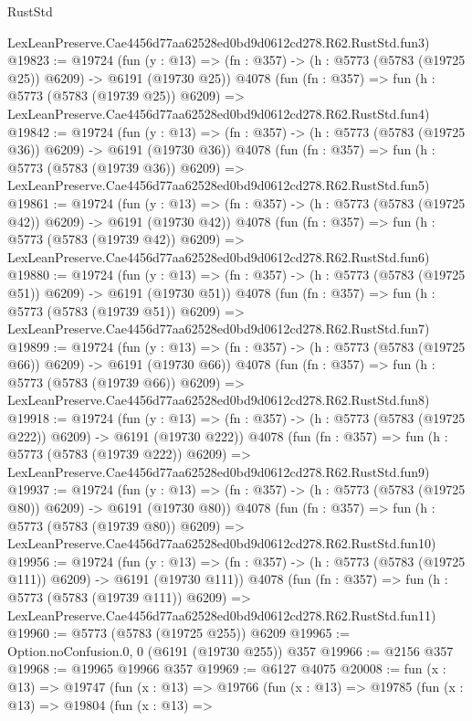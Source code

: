 \begin{lexlean}{RustStd}
\begin{coremodule}
    LexLeanPreserve.Cae4456d77aa62528ed0bd9d0612cd278.R62.RustStd.fun3)
@19823 := @19724
    (fun (y : @13) => (fn : @357) -> (h : @5773 (@5783 (@19725 @25)) @6209) -> @6191 (@19730 @25))
    @4078
    (fun (fn : @357) =>
    fun (h : @5773 (@5783 (@19739 @25)) @6209) =>
    LexLeanPreserve.Cae4456d77aa62528ed0bd9d0612cd278.R62.RustStd.fun4)
@19842 := @19724
    (fun (y : @13) => (fn : @357) -> (h : @5773 (@5783 (@19725 @36)) @6209) -> @6191 (@19730 @36))
    @4078
    (fun (fn : @357) =>
    fun (h : @5773 (@5783 (@19739 @36)) @6209) =>
    LexLeanPreserve.Cae4456d77aa62528ed0bd9d0612cd278.R62.RustStd.fun5)
@19861 := @19724
    (fun (y : @13) => (fn : @357) -> (h : @5773 (@5783 (@19725 @42)) @6209) -> @6191 (@19730 @42))
    @4078
    (fun (fn : @357) =>
    fun (h : @5773 (@5783 (@19739 @42)) @6209) =>
    LexLeanPreserve.Cae4456d77aa62528ed0bd9d0612cd278.R62.RustStd.fun6)
@19880 := @19724
    (fun (y : @13) => (fn : @357) -> (h : @5773 (@5783 (@19725 @51)) @6209) -> @6191 (@19730 @51))
    @4078
    (fun (fn : @357) =>
    fun (h : @5773 (@5783 (@19739 @51)) @6209) =>
    LexLeanPreserve.Cae4456d77aa62528ed0bd9d0612cd278.R62.RustStd.fun7)
@19899 := @19724
    (fun (y : @13) => (fn : @357) -> (h : @5773 (@5783 (@19725 @66)) @6209) -> @6191 (@19730 @66))
    @4078
    (fun (fn : @357) =>
    fun (h : @5773 (@5783 (@19739 @66)) @6209) =>
    LexLeanPreserve.Cae4456d77aa62528ed0bd9d0612cd278.R62.RustStd.fun8)
@19918 := @19724
    (fun (y : @13) => (fn : @357) -> (h : @5773 (@5783 (@19725 @222)) @6209) -> @6191 (@19730 @222))
    @4078
    (fun (fn : @357) =>
    fun (h : @5773 (@5783 (@19739 @222)) @6209) =>
    LexLeanPreserve.Cae4456d77aa62528ed0bd9d0612cd278.R62.RustStd.fun9)
@19937 := @19724
    (fun (y : @13) => (fn : @357) -> (h : @5773 (@5783 (@19725 @80)) @6209) -> @6191 (@19730 @80))
    @4078
    (fun (fn : @357) =>
    fun (h : @5773 (@5783 (@19739 @80)) @6209) =>
    LexLeanPreserve.Cae4456d77aa62528ed0bd9d0612cd278.R62.RustStd.fun10)
@19956 := @19724
    (fun (y : @13) => (fn : @357) -> (h : @5773 (@5783 (@19725 @111)) @6209) -> @6191 (@19730 @111))
    @4078
    (fun (fn : @357) =>
    fun (h : @5773 (@5783 (@19739 @111)) @6209) =>
    LexLeanPreserve.Cae4456d77aa62528ed0bd9d0612cd278.R62.RustStd.fun11)
@19960 := @5773 (@5783 (@19725 @255)) @6209
@19965 := Option.noConfusion.{0, 0} (@6191 (@19730 @255)) @357
@19966 := @2156 @357
@19968 := @19965 @19966 @357
@19969 := @6127 @4075
@20008 := fun (x : @13) =>
  @19747
    (fun (x : @13) =>
    @19766
      (fun (x : @13) =>
      @19785
        (fun (x : @13) =>
        @19804
          (fun (x : @13) =>

\end{coremodule}
\end{lexlean}
